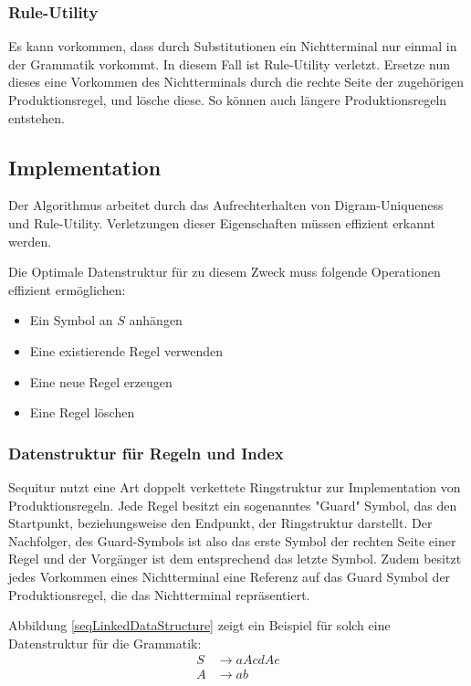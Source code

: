\subsubsection{Rule-Utility}

Es kann vorkommen, dass durch Substitutionen ein Nichtterminal nur einmal in der Grammatik vorkommt. In diesem Fall ist Rule-Utility verletzt. Ersetze nun dieses eine Vorkommen des Nichtterminals durch die rechte Seite der zugehörigen Produktionsregel, und lösche diese. So können auch längere Produktionsregeln entstehen.

\subsection{Implementation}

Der Algorithmus arbeitet durch das Aufrechterhalten von Digram-Uniqueness und Rule-Utility. Verletzungen dieser Eigenschaften müssen effizient erkannt werden.

Die Optimale Datenstruktur für zu diesem Zweck muss folgende Operationen effizient ermöglichen:

\begin{itemize}
	\item Ein Symbol an $S$ anhängen
	\item Eine existierende Regel verwenden
	\item Eine neue Regel erzeugen
	\item Eine Regel löschen
\end{itemize}

\subsubsection{Datenstruktur für Regeln und Index}

Sequitur nutzt eine Art doppelt verkettete Ringstruktur zur Implementation von Produktionsregeln. 
Jede Regel besitzt ein sogenanntes "Guard" Symbol, das den Startpunkt, beziehungsweise den Endpunkt, der Ringstruktur darstellt. Der Nachfolger, des Guard-Symbols ist also das erste Symbol der rechten Seite einer Regel und der Vorgänger ist dem entsprechend das letzte Symbol.
Zudem besitzt jedes Vorkommen eines Nichtterminal eine Referenz auf das Guard Symbol der Produktionsregel, die das Nichtterminal repräsentiert. 

Abbildung \ref{seqLinkedDataStructure} zeigt ein Beispiel für solch eine Datenstruktur für die Grammatik:
\begin{align*}
	S &\rightarrow aAcdAe\\
	A &\rightarrow ab
\end{align*}

